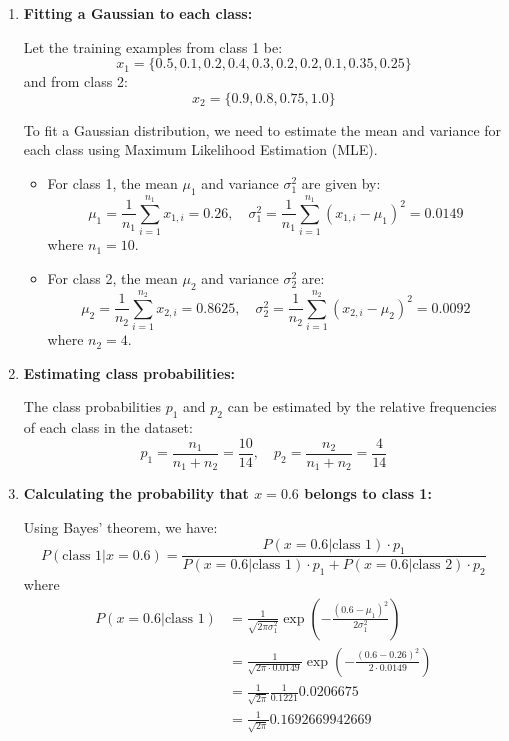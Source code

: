 \documentclass{article}
\begin{document}
\begin{enumerate}
    \item \textbf{Fitting a Gaussian to each class:}
    
    Let the training examples from class 1 be:
    \[
    x_1 = \{0.5, 0.1, 0.2, 0.4, 0.3, 0.2, 0.2, 0.1, 0.35, 0.25\}
    \]
    and from class 2:
    \[
    x_2 = \{0.9, 0.8, 0.75, 1.0\}
    \]

    To fit a Gaussian distribution, we need to estimate the mean and variance for each class using Maximum Likelihood Estimation (MLE).

    \begin{itemize}
        \item For class 1, the mean $\mu_1$ and variance $\sigma_1^2$ are given by:
        \[
        \mu_1 = \frac{1}{n_1} \sum_{i=1}^{n_1} x_{1,i} = 0.26, \quad \sigma_1^2 = \frac{1}{n_1} \sum_{i=1}^{n_1} (x_{1,i} - \mu_1)^2 = 0.0149
        \]
        where $n_1 = 10$.

        \item For class 2, the mean $\mu_2$ and variance $\sigma_2^2$ are:
        \[
        \mu_2 = \frac{1}{n_2} \sum_{i=1}^{n_2} x_{2,i} = 0.8625, \quad \sigma_2^2 = \frac{1}{n_2} \sum_{i=1}^{n_2} (x_{2,i} - \mu_2)^2 = 0.0092
        \]
        where $n_2 = 4$.
    \end{itemize}

    \item \textbf{Estimating class probabilities:}
    
    The class probabilities \( p_1 \) and \( p_2 \) can be estimated by the relative frequencies of each class in the dataset:
    \[
    p_1 = \frac{n_1}{n_1 + n_2} = \frac{10}{14}, \quad p_2 = \frac{n_2}{n_1 + n_2}  = \frac{4}{14}
    \]

    \item \textbf{Calculating the probability that \( x = 0.6 \) belongs to class 1:}
    
    Using Bayes' theorem, we have:
    \[
    P(\text{class } 1 | x = 0.6) = \frac{P(x = 0.6 | \text{class } 1) \cdot p_1}{P(x = 0.6 | \text{class } 1) \cdot p_1 + P(x = 0.6 | \text{class } 2) \cdot p_2}
    \]
    where
    \begin{equation*}
    \begin{aligned}        
        P(x = 0.6 | \text{class } 1) 
        &= \frac{1}{\sqrt{2 \pi \sigma_1^2}} \exp\left(-\frac{(0.6 - \mu_1)^2}{2 \sigma_1^2}\right) \\
        &= \frac{1}{\sqrt{2 \pi \cdot 0.0149}} \exp\left(-\frac{(0.6 - 0.26)^2}{2 \cdot 0.0149}\right)  \\
        &= \frac{1}{\sqrt{2 \pi }} \frac{1}{0.1221} 0.0206675   \\ 
        &= \frac{1}{\sqrt{2 \pi }}  0.1692669942669
    \end{aligned}
    \end{equation*}
    

\end{enumerate}
\end{document}
